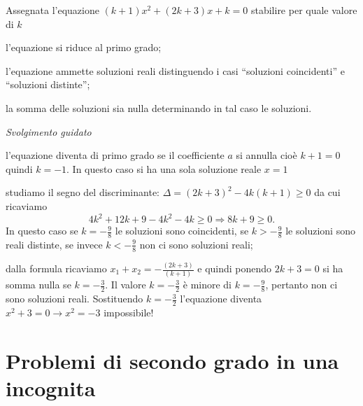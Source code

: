 \begin{exrig}
\begin{esempio}
Assegnata l'equazione $( k + 1 ) x^{2} + ( 2 k + 3 ) x + k = 0$ stabilire per 
quale valore di $k$
\begin{enumeratea}
\item l'equazione si riduce al primo grado;
\item l'equazione ammette soluzioni reali distinguendo i casi ``soluzioni 
coincidenti'' e ``soluzioni distinte'';
\item la somma delle soluzioni sia nulla determinando in tal caso le soluzioni.
\end{enumeratea}
\emph{Svolgimento guidato}
\begin{enumeratea}
\item l'equazione diventa di primo grado se il coefficiente $a$ si annulla cioè 
$k + 1 = 0$ quindi $k = - 1$. In questo caso si ha una sola soluzione reale $ 
x=1 $
\item studiamo il segno del discriminante: $\Delta = ( 2 k + 3 )^{2} - 4 k ( k + 
1 ) \geq 0$ da cui ricaviamo 
\[4 k^{2} + 12 k + 9 - 4 k^{2} - 4 k \geq 0 \Rightarrow 8 k + 9 \geq 0.\] 
In questo caso se $k = - \frac{9}{8}$ le soluzioni sono coincidenti, se $k > - 
\frac{9}{8}$ le soluzioni sono reali distinte, se invece $ k<-\frac{9}{8} $ non 
ci sono soluzioni reali;
\item dalla formula ricaviamo $x_{1} + x_{2} = - \frac{( 2 k + 3 )}{( k + 1 )}$ 
e quindi ponendo $2 k + 3 = 0$ si ha somma nulla se $k = - \frac{3}{2}$. Il 
valore $k = - \frac{3}{2}$ è minore di $k = - \frac{9}{8}$, pertanto non ci sono 
soluzioni reali. Sostituendo $k = - \frac{3}{2}$ l'equazione diventa $ x^2+3=0 
\to x^2=-3$ impossibile!
\end{enumeratea}
\end{esempio}
\end{exrig}
% 

\section{Problemi di secondo grado in una incognita}
\label{sec:eq2gr_problemi}


